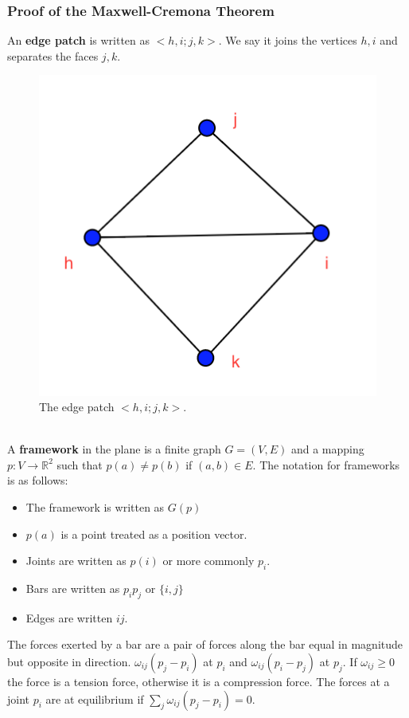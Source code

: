 \documentclass[english]{article}
\newcommand{\R}{\mathbb{R}}
\begin{document}
\subsubsection{Proof of the Maxwell-Cremona Theorem}
An \textbf{edge patch} is written as $<h,i;j,k>$. We say it joins the vertices $h,i$ and separates the faces $j,k$.
\begin{figure}[h]
      \centering
      \includegraphics[scale=.3]{edge_patch}       
      \caption{The edge patch $<h,i;j,k>$.}
      \label{fig: Figure 4}
  \end{figure}\\
  
A \textbf{framework} in the plane is a finite graph $G=(V,E)$ and a mapping $p: V \rightarrow \R^2$ such that $p(a) \neq p(b)$ if $(a,b) \in E$. The notation for frameworks is as follows: 

\begin{itemize}
	\item The framework is written as $G(p)$
	\item $p(a)$ is a point treated as a position vector. 
	\item Joints are written as $p(i)$ or more commonly $p_i$.
	\item Bars are written as $p_ip_j$ or $\{i,j\}$
	\item Edges are written $ij$.
\end{itemize}

The forces exerted by a bar are a pair of forces along the bar equal in magnitude but opposite in direction. $\omega_{ij}(p_j - p_i)$ at $p_i$ and $\omega_{ij}(p_i - p_j)$ at $p_j$. If $\omega_{ij} \geq 0$ the force is a tension force, otherwise it is a compression force. The forces at a joint $p_i$ are at equilibrium if $\sum_j \omega_{ij}(p_j-p_i) = 0$.
\end{document}
